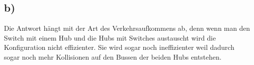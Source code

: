 \documentclass[a4paper,12pt]{scrartcl}
\begin{document}
\subsection{b)}
Die Antwort hängt mit der Art des Verkehrsaufkommens ab, denn wenn man den Switch mit einem Hub und die Hubs mit Switches austauscht wird die Konfiguration nicht effizienter. Sie wird sogar noch ineffizienter weil dadurch sogar noch mehr Kollisionen auf den Bussen der beiden Hubs entstehen.
\end{document}
